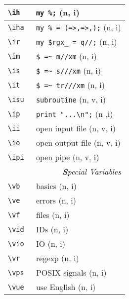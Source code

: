 \documentclass[oneside,10pt,landscape,DIV17]{scrartcl}
\begin{document}
\begin{multicols}{3}
\begin{center}
\begin{tabular}[]{|p{11mm}|p{60mm}|}
\hline \verb'\ih  '  & \verb'my %;'              \hfill (n, i)   \\
\hline \verb'\iha '  & \verb'my % = (=>,=>,);'   \hfill (n, i)   \\
%
\hline \verb'\ir'  & \verb'my $rgx_ = q//;'    \hfill (n, i)   \\
\hline \verb'\im'  & \verb'$ =~ m//xm'         \hfill (n, i)   \\
\hline \verb'\is'  & \verb'$ =~ s///xm'        \hfill (n, i)   \\
\hline \verb'\it'  & \verb'$ =~ tr///xm'       \hfill (n, i)   \\
\hline \verb'\isu' & \verb'subroutine'         \hfill (n, v, i)\\
\hline \verb'\ip'  & \verb'print "...\n";'     \hfill (n ,i)   \\
\hline \verb'\ii'  & open input file           \hfill (n, v, i)\\
\hline \verb'\io'  & open output file          \hfill (n, v, i)\\
\hline \verb'\ipi' & open pipe                 \hfill (n, v, i)\\
\hline
\hline
\multicolumn{2}{|r|}{\textsl{\textbf{S}pecial Variables}}            \\[1.0ex]
\hline \verb'\vb'   & basics                           \hfill (n, i)\\
\hline \verb'\ve'   & errors                           \hfill (n, i)\\
\hline \verb'\vf'   & files                            \hfill (n, i)\\
\hline \verb'\vid'  & IDs                              \hfill (n, i)\\
\hline \verb'\vio'  & IO                               \hfill (n, i)\\
\hline \verb'\vr'   & regexp                           \hfill (n, i)\\
\hline \verb'\vps'  & POSIX signals                    \hfill (n, i)\\
\hline \verb'\vue'  & use English                      \hfill (n, i)\\
\hline
\end{tabular}\\
%

\end{center}
\end{multicols}
\end{document}
